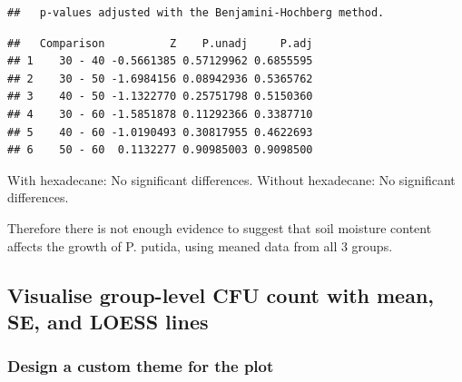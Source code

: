 \documentclass[
]{article}
\begin{document}
\begin{verbatim}
##   p-values adjusted with the Benjamini-Hochberg method.
\end{verbatim}

\begin{verbatim}
##   Comparison          Z    P.unadj     P.adj
## 1    30 - 40 -0.5661385 0.57129962 0.6855595
## 2    30 - 50 -1.6984156 0.08942936 0.5365762
## 3    40 - 50 -1.1322770 0.25751798 0.5150360
## 4    30 - 60 -1.5851878 0.11292366 0.3387710
## 5    40 - 60 -1.0190493 0.30817955 0.4622693
## 6    50 - 60  0.1132277 0.90985003 0.9098500
\end{verbatim}

With hexadecane: No significant differences. Without hexadecane: No
significant differences.

Therefore there is not enough evidence to suggest that soil moisture
content affects the growth of P. putida, using meaned data from all 3
groups.

\subsection{Visualise group-level CFU count with mean, SE, and LOESS
lines}\label{visualise-group-level-cfu-count-with-mean-se-and-loess-lines}

\subsubsection{Design a custom theme for the
plot}\label{design-a-custom-theme-for-the-plot}
\end{document}
